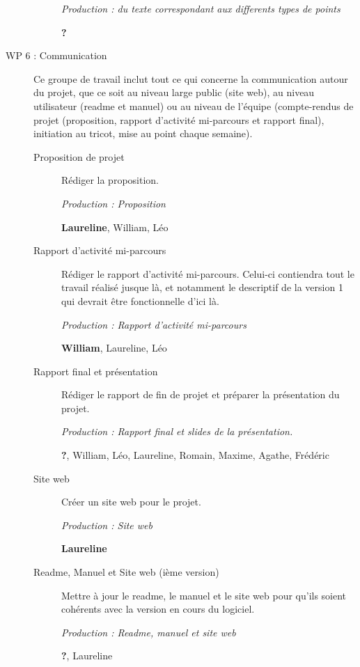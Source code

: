 \documentclass{article}
\begin{document}
\begin{description}
\begin{description}
    \textit{Production : du texte correspondant aux differents types de points}

    \textbf{?}
  \end{description}
\medskip

\item[WP 6 : Communication] Ce groupe de travail inclut tout ce qui concerne la communication autour du projet, que ce soit au niveau 
large public (site web), au niveau utilisateur (readme et manuel) ou au niveau de l'équipe (compte-rendus de projet (proposition, rapport 
d'activité mi-parcours et rapport final), initiation au tricot, mise au point chaque semaine).


  \begin{description}
  \item[Proposition de projet] Rédiger la proposition.

    \textit{Production : Proposition}

    \textbf{Laureline}, William, Léo

  \item[Rapport d'activité mi-parcours] Rédiger le rapport d'activité mi-parcours. Celui-ci contiendra tout le travail réalisé jusque là, 
et notamment le descriptif de la version 1 qui devrait être fonctionnelle d'ici là.

    \textit{Production : Rapport d'activité mi-parcours}

    \textbf{William}, Laureline, Léo

  \item[Rapport final et présentation] Rédiger le rapport de fin de projet et préparer la présentation du projet.

    \textit{Production : Rapport final et slides de la présentation.}

    \textbf{?}, William, Léo, Laureline, Romain, Maxime, Agathe, Frédéric

  \item[Site web] Créer un site web pour le projet. %

    \textit{Production : Site web}

    \textbf{Laureline}

  \item[Readme, Manuel et Site web (ième version)] Mettre à jour le readme, le manuel et le site web pour qu'ils soient cohérents avec la 
version en cours du logiciel.

    \textit{Production : Readme, manuel et site web}

    \textbf{?}, Laureline
  \end{description}

\medskip

\end{description}
\end{document}
